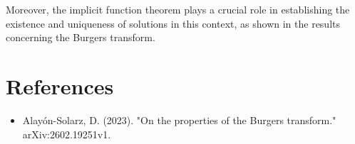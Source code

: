 \documentclass[11pt,a4paper]{article}
\begin{document}
Moreover, the implicit function theorem plays a crucial role in establishing the existence and uniqueness of solutions in this context, as shown in the results concerning the Burgers transform.

\section{References}
\begin{itemize}
    \item Alayón-Solarz, D. (2023). "On the properties of the Burgers transform." arXiv:2602.19251v1.
\end{itemize}
\end{document}
